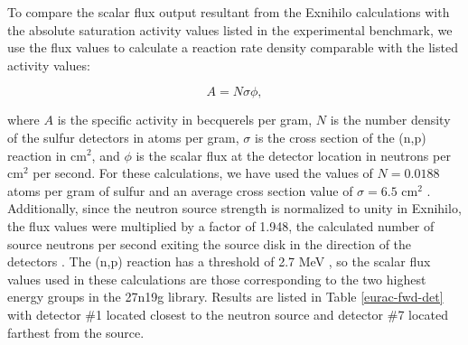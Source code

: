 To compare the scalar flux output resultant from the Exnihilo calculations with the
absolute saturation activity values listed in the experimental benchmark, we use the
flux values to calculate a reaction rate density \cite{dude} comparable with the
listed activity values:

\begin{equation}
A = N\sigma\phi,
\label{eq:act}
\end{equation}

\noindent where $A$ is the specific activity in becquerels per gram, $N$ is the number 
density of the sulfur detectors in atoms per gram, $\sigma$ is the cross section of
the (n,p) reaction in cm$^2$, and $\phi$ is the scalar flux at 
the detector location in neutrons per cm$^2$ per second. For these calculations, we
have used the values of $N = 0.0188$ atoms per gram of sulfur \cite{sinbad} and
an average cross section value of $\sigma = 6.5$ cm$^2$ \cite{s32xs}.
Additionally, since the neutron source strength is normalized to unity in Exnihilo,
the flux values were multiplied by a factor of 1.948, the calculated number of
source neutrons per second exiting the source disk in the direction of the detectors 
\cite{sinbad}. The (n,p) reaction has a threshold of 2.7 MeV
\cite{eurac}, so the scalar flux values used in these calculations are those
corresponding to the two highest energy groups in the 27n19g library. Results are
listed in Table \ref{eurac-fwd-det} with detector \#1 located closest to the neutron
source and detector \#7 located farthest from the source.

